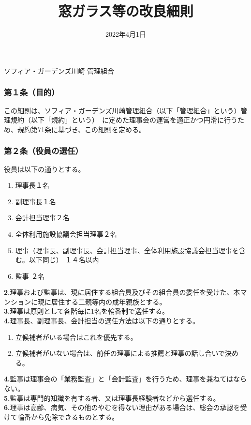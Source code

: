 \documentclass[
  luatex,
  paper=a4paper,
  fontsize=11pt,
  jafontsize=11pt,
  jlreq_notes,
]{jlreq}
\renewcommand{\baselinestretch}{0.9}
\begin{document}
  \title{窓ガラス等の改良細則}
  \date{2022年4月1日}
  \maketitle
  \thispagestyle{empty}
  \vspace*{3\baselineskip}

  {
    \small
    \renewcommand{\baselinestretch}{0.8}\selectfont   %
    \tableofcontents
  }
  \vfill      %
  \begin{center}
    {\Large ソフィア・ガーデンズ川崎 管理組合}
  \end{center}
  \clearpage
  

  \setcounter{page}{1}    %
  \pagestyle{plain}       %

  \subsubsection*{ 第１条（目的）}
  この細則は、ソフィア・ガーデンズ川崎管理組合（以下「管理組合」という）管理規約（以下「規約」という）\
  に定めた理事会の運営を適正かつ円滑に行うため、規約第71条に基づき、この細則を定める。
  \subsubsection*{ 第２条（役員の選任）}
  役員は以下の通りとする。
  \begin{enumerate}
  \item 理事長１名
  \item 副理事長１名
  \item 会計担当理事２名
  \item 全体利用施設協議会担当理事２名
  \item 理事（理事長、副理事長、会計担当理事、全体利用施設協議会担当理事を含む。以下同じ） １４名以内
  \item 監事    ２名
  \end{enumerate}
  \textbf{2.}理事および監事は、現に居住する組合員及びその組合員の委任を受けた、本マンションに現に居住する二親等内の成年親族とする。\\
  \textbf{3.}理事は原則として各階毎に1名を輪番制で選任する。\\
  \textbf{4.}理事長、副理事長、会計担当の選任方法は以下の通りとする。
  \begin{enumerate}
  \item 立候補者がいる場合はこれを優先する。
  \item 立候補者がいない場合は、前任の理事による推薦と理事の話し合いで決める。
  \end{enumerate}
  \textbf{4.}監事は理事会の「業務監査」と「会計監査」を行うため、理事を兼ねてはならない。\\
  \textbf{5.}監事は専門的知識を有する者、又は理事長経験者などから選任する。\\
  \textbf{6.}理事は高齢、病気、その他のやむを得ない理由がある場合は、総会の承認を受けて輪番から免除できるものとする。
\end{document}

